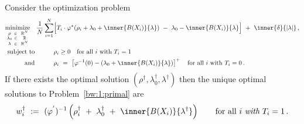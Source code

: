 \begin{ftheorem}
  \label{dual_solution_th}
  Consider the optimization problem
\begin{align}
  \label{dual}
  \begin{split}
  \underset
  {\begin{smallmatrix}
      \rho&\in&&\R^N 
      \\
      \lambda_0 & \in&&\R
      \\
      \lambda&\in&&\R^{N}
  \end{smallmatrix}}
  {
    \mathrm{minimize}
  }
  \quad
  \frac{1}{N}
\sum_{i=1} 
  ^N
  &
  \Big[
  T_i
  \cdot
  \varphi^*
  \!
  \left( 
    \rho_i
    +
\lambda_0
+
\inner
{B(X_i)}
{
\lambda
}
  \right)
  \ 
  -
  \ 
\lambda_0
-
\inner
{B(X_i)}
{
\lambda
}
\Big]
  \ 
+
\ 
\inner
{\delta}
{
  |\lambda|
}
  \,,
  \\
  \mathrm{subject}\ \mathrm{to}
  \quad
  \qquad
  &
  \rho_i \ge 0 
  \quad 
  \mathrm{for}\ \mathrm{all}\ i \ \text{with}\ T_i=1
  \qquad 
  \\
  \mathrm{and}
  \quad
  \qquad
  &
  \rho_i
  \ 
  =
  \ 
  \left[ 
  \varphi^{-1}
  (0)
  -
  \left( 
  \lambda_0 + \inner{B(X_i)}{\lambda}
  \right)
  \right]^+
  \quad 
  \mathrm{for}\ \mathrm{all}\ i \ \text{with}\ T_i=0
  \,.
\end{split}
\end{align}
If there exists the optimal solution 
$
(\rho^\dagger,\lambda_0^\dagger,\lambda^\dagger)
$
then the unique optimal solutions to Problem~\ref{bw:1:primal} are 
\begin{gather*}
  w^\dagger_i
  \ 
  :=
  \ 
  (
  \varphi^{'}
  )^{-1}
  \left(
    \rho^\dagger_i
  \ 
    +
  \ 
\lambda_0^\dagger
  \ 
+
  \ 
\inner
{B(X_i)}
{
\lambda^{\dagger}
}
  \right)
  \qquad
  \text{for all}\ 
  i
  \ \textit{with}\ T_i=1
  \,.
\end{gather*}
\end{ftheorem}

